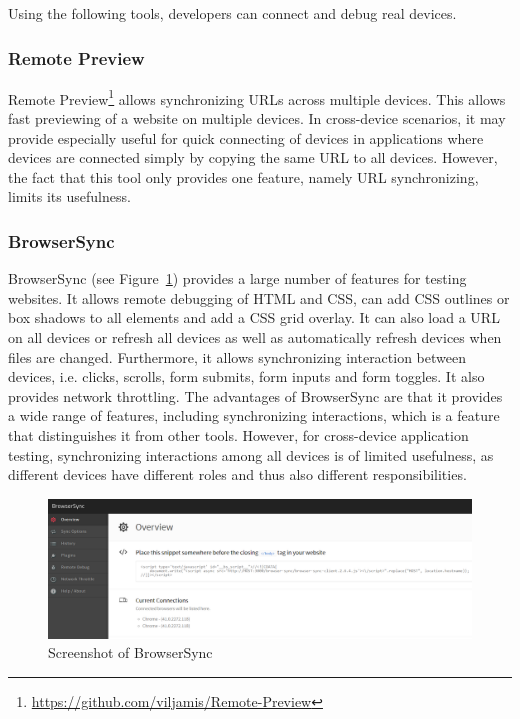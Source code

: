 Using the following tools, developers can connect and debug real devices. 

\subsubsection{Remote Preview}

Remote Preview\footnote{\url{https://github.com/viljamis/Remote-Preview}} allows synchronizing URLs across multiple devices. This allows fast previewing of a website on multiple devices. In cross-device scenarios, it may provide especially useful for quick connecting of devices in applications where devices are connected simply by copying the same URL to all devices. However, the fact that this tool only provides one feature, namely URL synchronizing, limits its usefulness.

\subsubsection{BrowserSync}

BrowserSync (see Figure~\ref{fig:browsersync}) provides a large number of features for testing websites. It allows remote debugging of HTML and CSS, can add CSS outlines or box shadows to all elements and add a CSS grid overlay. It can also load a URL on all devices or refresh all devices as well as automatically refresh devices when files are changed. Furthermore, it allows synchronizing interaction between devices, i.e. clicks, scrolls, form submits, form inputs and form toggles. It also provides network throttling. The advantages of BrowserSync are that it provides a wide range of features, including synchronizing interactions, which is a feature that distinguishes it from other tools. However, for cross-device application testing, synchronizing interactions among all devices is of limited usefulness, as different devices have different roles and thus also different responsibilities.

\begin{figure}[H]
  \centering
    \includegraphics[width=1.0\textwidth]{images/relatedwork/browser_sync_3.png}
	\caption[Screenshot: BrowserSync]{Screenshot of BrowserSync}
	\label{fig:browsersync}
\end{figure}

